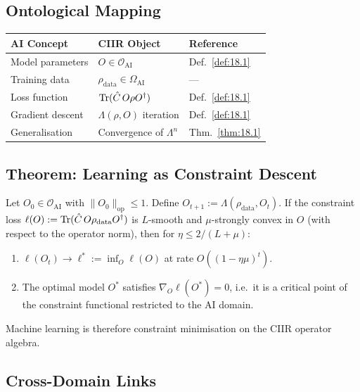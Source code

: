 \subsection{Ontological Mapping}

\begin{center}
\begin{tabular}{lll}
\toprule
\textbf{AI Concept} & \textbf{CIIR Object} & \textbf{Reference} \\
\midrule
Model parameters & $O \in \mathcal{O}_{\mathrm{AI}}$ & Def.~\ref{def:18.1} \\
Training data & $\rho_{\mathrm{data}} \in \Omega_{\mathrm{AI}}$ & --- \\
Loss function & $\mathrm{Tr}(\hat{C}\, O \rho O^\dagger)$ & Def.~\ref{def:18.1} \\
Gradient descent & $\Lambda(\rho, O)$ iteration & Def.~\ref{def:18.1} \\
Generalisation & Convergence of $\Lambda^n$ & Thm.~\ref{thm:18.1} \\
\bottomrule
\end{tabular}
\end{center}

\subsection{Theorem: Learning as Constraint Descent}

\begin{theorem}\label{thm:18.1}
Let $O_0 \in \mathcal{O}_{\mathrm{AI}}$ with
$\|O_0\|_{\mathrm{op}} \leq 1$.  Define $O_{t+1} :=
\Lambda(\rho_{\mathrm{data}}, O_t)$.  If the constraint loss
$\ell(O) := \mathrm{Tr}(\hat{C}\, O \rho_{\mathrm{data}} O^\dagger)$ is
$L$-smooth and $\mu$-strongly convex in $O$ (with respect to the
operator norm), then for $\eta \leq 2/(L + \mu)$:
\begin{enumerate}
  \item[\textup{(i)}] $\ell(O_t) \to \ell^* := \inf_O \ell(O)$
    at rate $O((1 - \eta\mu)^t)$.
  \item[\textup{(ii)}] The optimal model $O^*$ satisfies
    $\nabla_O \ell(O^*) = 0$, i.e.\ it is a critical point of the
    constraint functional restricted to the AI domain.
\end{enumerate}
Machine learning is therefore constraint minimisation on the
CIIR operator algebra.
\end{theorem}

\subsection{Cross-Domain Links}

